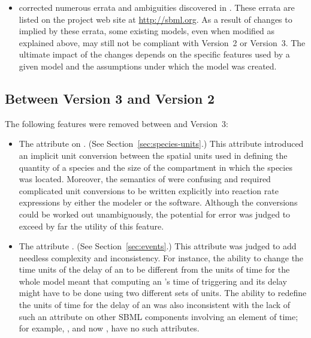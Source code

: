 \begin{itemize}
\item \sbmltwotwo corrected numerous errata and ambiguities
  discovered in \sbmltwoone.  These errata are listed on the
  project web site at \url{http://sbml.org}.  As a result of
  changes to \sbmltwo implied by these errata, some existing
  \sbmltwoone models, even when modified as explained above, may
  still not be compliant with Version~2 or Version~3.  The
  ultimate impact of the changes depends on the specific features
  used by a given model and the assumptions under which the model
  was created.

\end{itemize}




\subsection{Between Version 3 and Version 2}

The following features were removed between \sbmltwotwo and
Version~3:
\begin{itemize}

\item The  attribute on \Species.  (See
  Section~\ref{sec:species-units}.)  This attribute introduced an
  implicit unit conversion between the spatial units used in
  defining the quantity of a species and the size of the
  compartment in which the species was located.  Moreover, the
  semantics of  were confusing and
  required complicated unit conversions to be written explicitly
  into reaction rate expressions by either the modeler or the
  software.  Although the conversions could be worked out
  unambiguously, the potential for error was judged to exceed by
  far the utility of this feature.

\item The  attribute \Event.  (See
  Section~\ref{sec:events}.)  This attribute was judged to add
  needless complexity and inconsistency.  For instance, the
  ability to change the time units of the delay of an \Event to be
  different from the units of time for the whole model meant that
  computing an \Event's time of triggering and its delay might
  have to be done using two different sets of units.  The ability
  to redefine the units of time for the delay of an \Event was
  also inconsistent with the lack of such an attribute on other SBML
  components involving an element of time; for example, \RateRule,
  and now \KineticLaw, have no such attributes.

\end{itemize}

